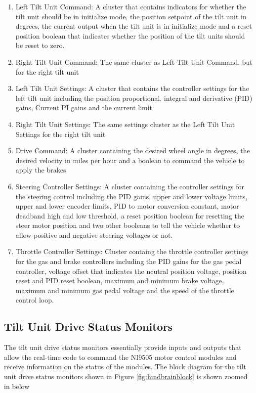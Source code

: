 \begin{enumerate}
\item Left Tilt Unit Command: A cluster that contains indicators for whether the tilt unit should be in initialize mode, the position setpoint of the tilt unit in degrees, the current output when the tilt unit is in initialize mode and a reset position boolean that indicates whether the position of the tilt units should be reset to zero.
\item Right Tilt Unit Command: The same cluster as Left Tilt Unit Command, but for the right tilt unit
\item Left Tilt Unit Settings: A cluster that contains the controller settings for the left tilt unit including the position proportional, integral and derivative (PID) gains, Current PI gains and the current limit
\item Right Tilt Unit Settings: The same settings cluster as the Left Tilt Unit Settings for the right tilt unit
\item Drive Command: A cluster containing the desired wheel angle in degrees, the desired velocity in miles per hour and a boolean to command the vehicle to apply the brakes
\item Steering Controller Settings: A cluster containing the controller settings for the steering control including the PID gains, upper and lower voltage limits, upper and lower encoder limits, PID to motor conversion constant, motor deadband high and low threshold, a reset position boolean for resetting the steer motor position and two other booleans to tell the vehicle whether to allow positive and negative steering voltages or not.
\item Throttle Controller Settings: Cluster containg the throttle controller settings for the gas and brake controllers including the PID gains for the gas pedal controller, voltage offset that indicates the neutral position voltage, position reset and PID reset boolean, maximum and minimum brake voltage, maximum and minimum gas pedal voltage and the speed of the throttle control loop. 
\end{enumerate}

\subsection{Tilt Unit Drive Status Monitors}
The tilt unit drive status monitors essentially provide inputs and outputs that allow the real-time code to command the NI9505 motor control modules and receive information on the status of the modules. The block diagram for the tilt unit drive status monitors shown in Figure \ref{fig:hindbrainblock} is shown zoomed in below

